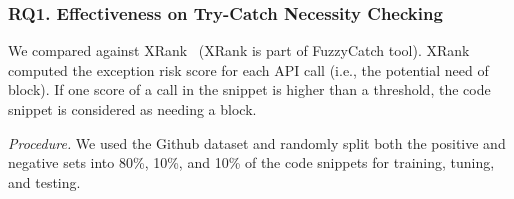 


\subsubsection{RQ1. Effectiveness on Try-Catch Necessity Checking\\}

 We compared {\xblock} against
XRank~\cite{xrank-fse20} (XRank is part of FuzzyCatch tool). XRank
computed the exception risk score for each API call (i.e., the
potential need of  block). If one score of a call in
the snippet is higher than a threshold, the code snippet is considered
as needing a  block.

{\em Procedure.} We used the Github dataset and randomly split both
the positive and negative sets into 80\%, 10\%, and 10\% of the code
snippets for training, tuning, and testing.



